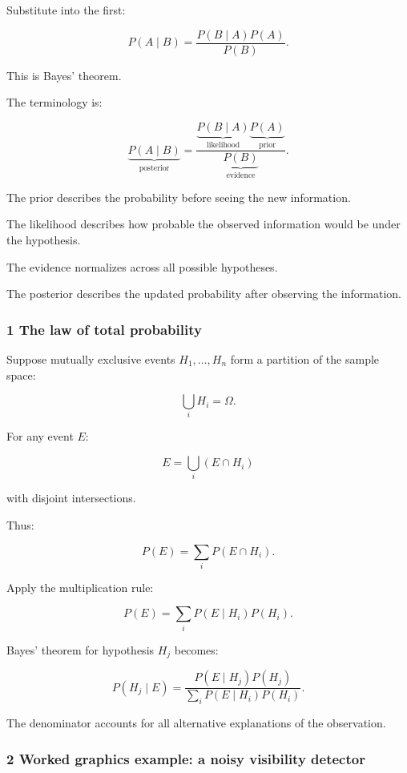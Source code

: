 Substitute into the first:

\[
 \boxed{ P(A\mid B) = \frac{P(B\mid A)P(A)}{P(B)} }.
\]

This is Bayes' theorem.

The terminology is:

\[
 \underbrace{P(A\mid B)}_{\text{posterior}} = \frac{ \underbrace{P(B\mid A)}_{\text{likelihood}} \underbrace{P(A)}_{\text{prior}} }{ \underbrace{P(B)}_{\text{evidence}} }.
\]

The prior describes the probability before seeing the new information.

The likelihood describes how probable the observed information would be under the hypothesis.

The evidence normalizes across all possible hypotheses.

The posterior describes the updated probability after observing the information.

\subsubsection{1 The law of total probability}\label{02-foundations-ii-ch023-the-law-of-total-probability}

\hypertarget{02-foundations-ii-ch023-the-law-of-total-probability}{}

Suppose mutually exclusive events \(H_1,\ldots,H_n\) form a partition of the sample space:

\[
 \bigcup_iH_i=\Omega.
\]

For any event \(E\):

\[
 E=\bigcup_i(E\cap H_i)
\]

with disjoint intersections.

Thus:

\[
 P(E)=\sum_iP(E\cap H_i).
\]

Apply the multiplication rule:

\[
 \boxed{ P(E)=\sum_iP(E\mid H_i)P(H_i) }.
\]

Bayes' theorem for hypothesis \(H_j\) becomes:

\[
 \boxed{ P(H_j\mid E) = \frac{ P(E\mid H_j)P(H_j) }{ \sum_iP(E\mid H_i)P(H_i) } }.
\]

The denominator accounts for all alternative explanations of the observation.

\subsubsection{2 Worked graphics example: a noisy visibility detector}\label{02-foundations-ii-ch023-worked-graphics-example-a-noisy-visibility-detector}

